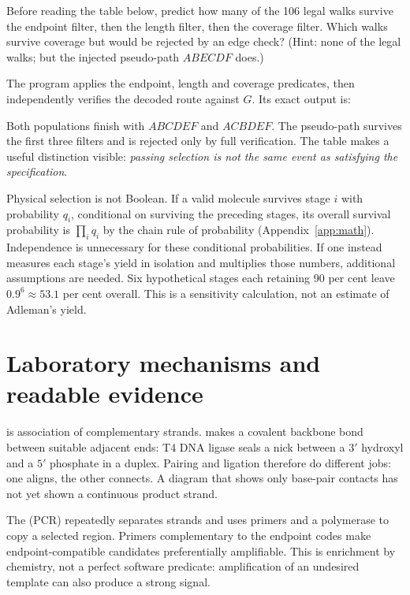 \begin{TryThis}
Before reading the table below, predict how many of the 106 legal walks survive
the endpoint filter, then the length filter, then the coverage filter. Which
walks survive coverage but would be rejected by an edge check? (Hint: none of
the legal walks; but the injected pseudo-path $ABECDF$ does.)
\end{TryThis}

The program applies the endpoint, length and coverage predicates, then
independently verifies the decoded route against $G$. Its exact output is:
\begin{center}\end{center}
Both populations finish with $ABCDEF$ and $ACBDEF$. The pseudo-path survives the
first three filters and is rejected only by full verification. The table makes a
useful distinction visible: \emph{passing selection is not the same event as
satisfying the specification}.

Physical selection is not Boolean. If a valid molecule survives stage $i$ with
probability $q_i$, conditional on surviving the preceding stages, its overall
survival probability is $\prod_i q_i$ by the chain rule of probability
(Appendix~\ref{app:math}). Independence is unnecessary for these conditional
probabilities. If one instead measures each stage's yield in isolation and
multiplies those numbers, additional assumptions are needed. Six hypothetical
stages each retaining 90 per cent leave $0.9^6\approx 53.1$ per cent overall.
This is a sensitivity calculation, not an estimate of Adleman's yield.

\section{Laboratory mechanisms and readable evidence}\label{sec:readout}
 is association of complementary strands. 
makes a covalent backbone bond between suitable adjacent ends: T4 DNA ligase seals
a nick between a $3'$ hydroxyl and a $5'$ phosphate in a duplex.\cite{NEBT4Ligase}
Pairing and ligation therefore do different jobs: one aligns, the other connects.
A diagram that shows only base-pair contacts has not yet shown a continuous
product strand.

The  (PCR) repeatedly separates strands and uses
primers and a polymerase to copy a selected region.\cite{NHGRIPCR} Primers
complementary to the endpoint codes make endpoint-compatible candidates
preferentially amplifiable. This is enrichment by chemistry, not a perfect
software predicate: amplification of an undesired template can also produce a
strong signal.

